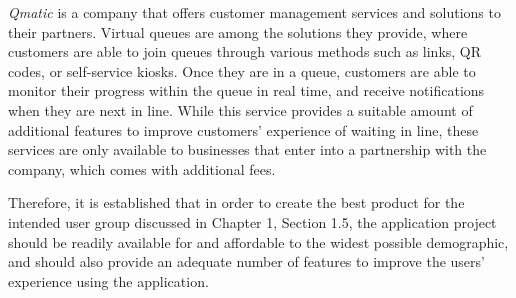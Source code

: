 \textit{Qmatic} \citeyear{qmatic} is a company that offers customer management services and solutions to their partners. Virtual queues are among the solutions they provide, where customers are able to join queues through various methods such as links, QR codes, or self-service kiosks. Once they are in a queue, customers are able to monitor their progress within the queue in real time, and receive notifications when they are next in line. While this service provides a suitable amount of additional features to improve customers’ experience of waiting in line, these services are only available to businesses that enter into a partnership with the company, which comes with additional fees.

Therefore, it is established that in order to create the best product for the intended user group discussed in Chapter 1, Section 1.5, the application project should be readily available for and affordable to the widest possible demographic, and should also provide an adequate number of features to improve the users’ experience using the application.

